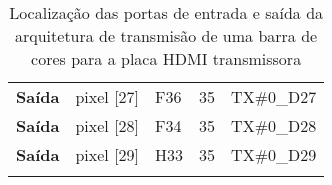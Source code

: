 \begin{longtable}{@{}rllll@{}}
			\multicolumn{1}{r|}{\textbf{Saída}} & pixel {[}27{]}                     & F36                                      & 35                                         & TX\#0\_D27                                      \\
			\multicolumn{1}{r|}{\textbf{Saída}} & pixel {[}28{]}                     & F34                                      & 35                                         & TX\#0\_D28                                      \\
			\multicolumn{1}{r|}{\textbf{Saída}} & pixel {[}29{]}                     & H33                                      & 35                                         & TX\#0\_D29                                      \\  
			\hline 
		
	\caption{Localização das portas de entrada e saída da arquitetura de transmisão de uma barra de cores para a placa HDMI transmissora}
	\label{table:locPlanAdetail}
\end{longtable}





